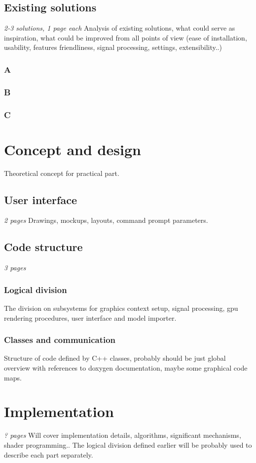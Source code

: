\section{Existing solutions}
\emph{2-3 solutions, 1 page each}
Analysis of existing solutions, what could serve as inspiration, what could be
improved from all points of view (ease of installation, usability, features
friendliness, signal processing, settings, extensibility..)
\subsection{A}
\subsection{B}
\subsection{C}
\chapter{Concept and design}
Theoretical concept for practical part.
\section{User interface}
\emph{2 pages}
Drawings, mockups, layouts, command prompt parameters.
\section{Code structure}
\emph{3 pages}
\subsection{Logical division}
The division on subsystems for graphics context setup, signal processing, gpu
rendering procedures, user interface and model importer.
\subsection{Classes and communication}
Structure of code defined by C++ classes, probably should be just global
overview with references to doxygen documentation, maybe some graphical code
maps.
\chapter{Implementation}
\emph{? pages}
Will cover implementation details, algorithms, significant mechanisms, shader
programming.. The logical division defined earlier will be probably used to
describe each part separately.
